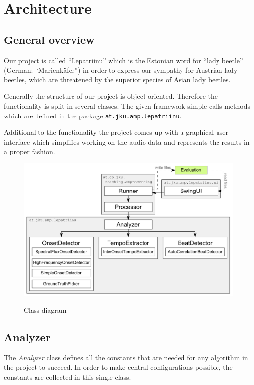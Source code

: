 \chapter{Architecture} \label{cpt:architecture}
\section{General overview} \label{sec:classes}
Our project is called ``Lepatriinu'' which is the Estonian word for ``lady
beetle'' (German: ``Marienkäfer'') in order to express our sympathy for Austrian
lady beetles, which are threatened by the superior species of Asian lady
beetles.

Generally the structure of our project is object oriented. Therefore the
functionality is split in several classes. The given framework simple calls
methods which are defined in the package \texttt{at.jku.amp.lepatriinu}.

Additional to the functionality the project comes up with a graphical user
interface which simplifies working on the audio data and represents the results
in a proper fashion.

\begin{figure}[htp]
  \centering
  \includegraphics[width=\textwidth-1em]{chapter/ClassDiagram}
  \label{fig:classdiagram}
  \caption{Class diagram}
\end{figure}

\section{\ttfamily Analyzer} \label{sec:analyzer}
The \emph{Analyzer} class defines all the constants that are needed for any
algorithm in the project to succeed. In order to make central configurations
possible, the constants are collected in this single class.

